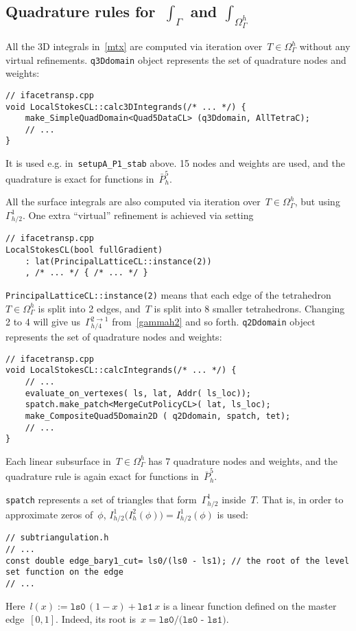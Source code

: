\documentclass[12pt]{article}
\begin{document}
\subsection{Quadrature rules for~$\int_{\Gamma}$ and $\int_{\Omega_\Gamma^h}$}\label{subsec:integrals}

All the 3D integrals in~\eqref{mtx} are computed via iteration over~$T \in \Omega_\Gamma^h$ without any virtual refinements. \texttt{q3Ddomain} object represents the set of quadrature nodes and weights:
\begin{lstlisting}
// ifacetransp.cpp
void LocalStokesCL::calc3DIntegrands(/* ... */) {
	make_SimpleQuadDomain<Quad5DataCL> (q3Ddomain, AllTetraC);
	// ...
}
\end{lstlisting} 
It is used e.g. in~\texttt{setupA\_P1\_stab} above. 15 nodes and weights are used, and the quadrature is exact for functions in~$\bar P_h^5$.

All the surface integrals are also computed via iteration over~$T \in \Omega_\Gamma^h$, but using~$\Gamma_{h/2}^1$. One extra ``virtual'' refinement is achieved via setting 
\begin{lstlisting}
// ifacetransp.cpp
LocalStokesCL(bool fullGradient) 
	: lat(PrincipalLatticeCL::instance(2))
	, /* ... */ { /* ... */ }
\end{lstlisting}
\texttt{PrincipalLatticeCL::instance(2)} means that each edge of the tetrahedron~$T \in \Omega_\Gamma^h$ is split into 2 edges, and~$T$ is split into 8 smaller tetrahedrons. Changing 2 to 4 will give us~$\Gamma_{h/4}^{2 \rightarrow 1}$ from~\eqref{gammah2} and so forth. \texttt{q2Ddomain} object represents the set of quadrature nodes and weights:
\begin{lstlisting}
// ifacetransp.cpp
void LocalStokesCL::calcIntegrands(/* ... */) {
	// ...
	evaluate_on_vertexes( ls, lat, Addr( ls_loc));
	spatch.make_patch<MergeCutPolicyCL>( lat, ls_loc);
	make_CompositeQuad5Domain2D ( q2Ddomain, spatch, tet);
	// ...
}
\end{lstlisting} 
Each linear subsurface in~$T \in \Omega_\Gamma^h$ has 7 quadrature nodes and weights, and the quadrature rule is again exact for functions in~$\bar P_h^5$.

\texttt{spatch} represents a set of triangles that form~$\Gamma_{h/2}^1$ inside~$T$. That is, in order to approximate zeros of~$\phi$, $I_{h/2}^1\big(I_{h}^2(\phi)\big) = I_{h/2}^1(\phi)$ is used:
\begin{lstlisting}
// subtriangulation.h
// ...
const double edge_bary1_cut= ls0/(ls0 - ls1); // the root of the level set function on the edge
// ...
\end{lstlisting}
Here~$l(x) := \texttt{ls0}\,(1-x) + \texttt{ls1}\,x$ is a linear function defined on the master edge~$[0, 1]$. Indeed, its root is~$x = \texttt{ls0/(ls0 - ls1)}$.
\end{document}
